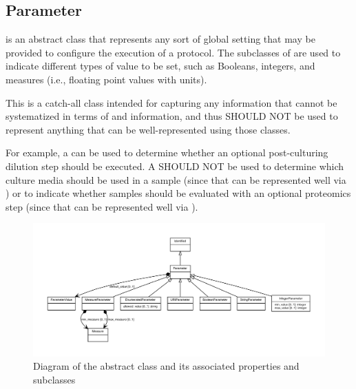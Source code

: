 \subsection{Parameter}
\label{sec:Parameter}


 is an abstract class that represents any sort of global setting that may be provided to configure the execution of a protocol.
The subclasses of  are used to indicate different types of value to be set, such as Booleans, integers, and measures (i.e., floating point values with units).

This is a catch-all class intended for capturing any information that cannot be systematized in terms of  and  information, and thus SHOULD NOT be used to represent anything that can be well-represented using those classes.

For example, a  can be used to determine whether an optional post-culturing dilution step should be executed.
A  SHOULD NOT be used to determine which culture media should be used in a sample (since that can be represented well via ) or to indicate whether samples should be evaluated with an optional proteomics step (since that can be represented well via ).



\begin{figure}[ht]
\begin{center}
\includegraphics[scale=0.6]{figures/Parameter_definition_and_abstraction}
\caption[]{Diagram of the  abstract class and its associated properties and subclasses}
\label{uml:Parameter}
\end{center}
\end{figure}

